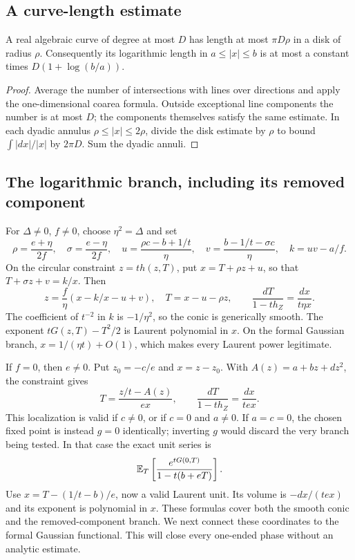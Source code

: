 \subsection{A curve-length estimate}

\begin{lemma}\label{lem:curvelength}
A real algebraic curve of degree at most $D$ has length at most
$\pi D\rho$ in a disk of radius $\rho$. Consequently its logarithmic
length in $a\leq|x|\leq b$ is at most a constant times
$D(1+\log(b/a))$.
\end{lemma}
\begin{proof}
Average the number of intersections with lines over directions and
apply the one-dimensional coarea formula. Outside exceptional line
components the number is at most $D$; the components themselves
satisfy the same estimate. In each dyadic annulus
$\rho\leq|x|\leq2\rho$, divide the disk estimate by $\rho$ to
bound $\int|dx|/|x|$ by $2\pi D$. Sum the dyadic annuli.
\end{proof}

\subsection{The logarithmic branch, including its removed component}

For $\Delta\ne0$, $f\ne0$, choose $\eta^2=\Delta$ and set
\[
 \rho=\frac{e+\eta}{2f},\quad \sigma=\frac{e-\eta}{2f},\quad
 u=\frac{\rho c-b+1/t}{\eta},\quad
 v=\frac{b-1/t-\sigma c}{\eta},\quad k=uv-a/f.
\]
On the circular constraint $z=th(z,T)$, put
$x=T+\rho z+u$, so that $T+\sigma z+v=k/x$. Then
\[
 z=\frac f\eta(x-k/x-u+v),\quad T=x-u-\rho z,
 \qquad
 \frac{dT}{1-th_Z}=\frac{dx}{t\eta x}.
\]
The coefficient of $t^{-2}$ in $k$ is $-1/\eta^2$, so the conic
is generically smooth. The exponent $tG(z,T)-T^2/2$ is Laurent
polynomial in $x$. On the formal Gaussian branch,
$x=1/(\eta t)+O(1)$, which makes every Laurent power legitimate.

If $f=0$, then $e\ne0$. Put $z_0=-c/e$ and $x=z-z_0$. With
$A(z)=a+bz+dz^2$, the constraint gives
\[
 T=\frac{z/t-A(z)}{ex},\qquad
 \frac{dT}{1-th_Z}=\frac{dx}{tex}.
\]
This localization is valid if $c\ne0$, or if $c=0$ and $a\ne0$.
If $a=c=0$, the chosen fixed point is instead $g=0$ identically;
inverting $g$ would discard the very branch being tested. In that
case the exact unit series is
\[
 \mathbb E_T\left[\frac{e^{tG(0,T)}}{1-t(b+eT)}\right].
\]
Use $x=T-(1/t-b)/e$, now a valid Laurent unit. Its volume is
$-dx/(tex)$ and its exponent is polynomial in $x$. These formulas
cover both the smooth conic and the removed-component branch.
We next connect these coordinates to the formal Gaussian functional.
This will close every one-ended phase without an analytic estimate.

